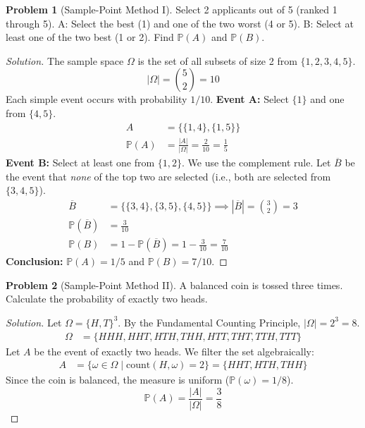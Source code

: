\documentclass[11pt, letterpaper]{article}
\theoremstyle{definition}
\newtheorem{example}{Problem}
\theoremstyle{remark}
\newcommand{\Prob}{\mathbb{P}}
\newcommand{\comp}[1]{\overline{#1}}
\begin{document}
\begin{example}[Sample-Point Method I]
    Select 2 applicants out of 5 (ranked 1 through 5). 
    A: Select the best (1) and one of the two worst (4 or 5). 
    B: Select at least one of the two best (1 or 2). Find $\Prob(A)$ and $\Prob(B)$.
\end{example}
\begin{proof}[Solution]
    The sample space $\Omega$ is the set of all subsets of size 2 from $\{1, 2, 3, 4, 5\}$.
    \[ |\Omega| = \binom{5}{2} = 10 \]
    Each simple event occurs with probability $1/10$.
    \textbf{Event A:} Select $\{1\}$ and one from $\{4, 5\}$.
    \begin{align*}
        A &= \{ \{1, 4\}, \{1, 5\} \} \\
        \Prob(A) &= \frac{|A|}{|\Omega|} = \frac{2}{10} = \frac{1}{5}
    \end{align*}
    \textbf{Event B:} Select at least one from $\{1, 2\}$. We use the complement rule. Let $\comp{B}$ be the event that \textit{none} of the top two are selected (i.e., both are selected from $\{3, 4, 5\}$).
    \begin{align*}
        \comp{B} &= \{ \{3, 4\}, \{3, 5\}, \{4, 5\} \} \implies |\comp{B}| = \binom{3}{2} = 3 \\
        \Prob(\comp{B}) &= \frac{3}{10} \\
        \Prob(B) &= 1 - \Prob(\comp{B}) = 1 - \frac{3}{10} = \frac{7}{10}
    \end{align*}
    \textbf{Conclusion:} $\Prob(A) = 1/5$ and $\Prob(B) = 7/10$.
\end{proof}

\begin{example}[Sample-Point Method II]
    A balanced coin is tossed three times. Calculate the probability of exactly two heads.
\end{example}
\begin{proof}[Solution]
    Let $\Omega = \{H, T\}^3$. By the Fundamental Counting Principle, $|\Omega| = 2^3 = 8$. 
    \begin{align*}
        \Omega &= \{HHH, HHT, HTH, THH, HTT, THT, TTH, TTT\}
    \end{align*}
    Let $A$ be the event of exactly two heads. We filter the set algebraically:
    \begin{align*}
        A &= \{\omega \in \Omega \mid \text{count}(H, \omega) = 2\} = \{HHT, HTH, THH\}
    \end{align*}
    Since the coin is balanced, the measure is uniform ($\Prob(\omega) = 1/8$).
    \[ \Prob(A) = \frac{|A|}{|\Omega|} = \frac{3}{8} \]
\end{proof}
\end{document}

